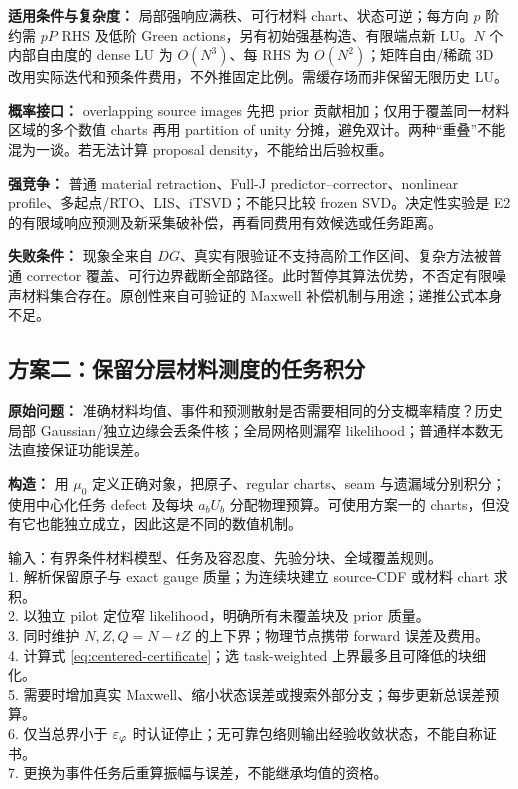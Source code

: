 \textbf{适用条件与复杂度：} 局部强响应满秩、可行材料 chart、状态可逆；每方向 $p$ 阶约需 $pP$ RHS 及低阶 Green actions，另有初始强基构造、有限端点新 LU。$N$ 个内部自由度的 dense LU 为 $O(N^3)$、每 RHS 为 $O(N^2)$；矩阵自由/稀疏 3D 改用实际迭代和预条件费用，不外推固定比例。需缓存场而非保留无限历史 LU。

\textbf{概率接口：} overlapping source images 先把 prior 贡献相加；仅用于覆盖同一材料区域的多个数值 charts 再用 partition of unity 分摊，避免双计。两种“重叠”不能混为一谈。若无法计算 proposal density，不能给出后验权重。

\textbf{强竞争：} 普通 material retraction、Full-J predictor--corrector、nonlinear profile、多起点/RTO、LIS、iTSVD；不能只比较 frozen SVD。决定性实验是 E2 的有限域响应预测及新采集破补偿，再看同费用有效候选或任务距离。

\textbf{失败条件：} 现象全来自 $DG$、真实有限验证不支持高阶工作区间、复杂方法被普通 corrector 覆盖、可行边界截断全部路径。此时暂停其算法优势，不否定有限噪声材料集合存在。原创性来自可验证的 Maxwell 补偿机制与用途；递推公式本身不足。

\subsection{方案二：保留分层材料测度的任务积分}
\textbf{原始问题：} 准确材料均值、事件和预测散射是否需要相同的分支概率精度？历史局部 Gaussian/独立边缘会丢条件核；全局网格则漏窄 likelihood；普通样本数无法直接保证功能误差。

\textbf{构造：} 用 $\mu_0$ 定义正确对象，把原子、regular charts、seam 与遗漏域分别积分；使用中心化任务 defect 及每块 $a_bU_b$ 分配物理预算。可使用方案一的 charts，但没有它也能独立成立，因此这是不同的数值机制。

\begin{tcolorbox}[title={算法 2：task-certified stratified integration}]
输入：有界条件材料模型、任务及容忍度、先验分块、全域覆盖规则。\\
1. 解析保留原子与 exact gauge 质量；为连续块建立 source-CDF 或材料 chart 求积。\\
2. 以独立 pilot 定位窄 likelihood，明确所有未覆盖块及 prior 质量。\\
3. 同时维护 $N,Z,Q=N-tZ$ 的上下界；物理节点携带 forward 误差及费用。\\
4. 计算式 \eqref{eq:centered-certificate}；选 task-weighted 上界最多且可降低的块细化。\\
5. 需要时增加真实 Maxwell、缩小状态误差或搜索外部分支；每步更新总误差预算。\\
6. 仅当总界小于 $\varepsilon_\varphi$ 时认证停止；无可靠包络则输出经验收敛状态，不能自称证书。\\
7. 更换为事件任务后重算振幅与误差，不能继承均值的资格。
\end{tcolorbox}

